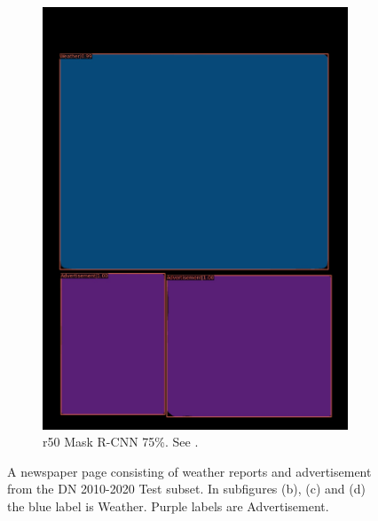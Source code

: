 \documentclass[oneside, english, bibtex]{kththesis}
\begin{document}
\begin{figure}[!htb]
\begin{adjustbox}{center,max size={\textwidth}{0.9\textheight}}
{\begin{subfigure}{0.6\textwidth}
\includegraphics[width=\linewidth]{figures/labels-vanilla-0.75/Jd55Bvg.jpg}
  \caption{r50 Mask R-CNN 75\%. See . }
  \label{fig:1RoKim0_pred}
\end{subfigure}}
\end{adjustbox}
  \caption{A newspaper page consisting of weather reports and advertisement from the DN 2010-2020 Test subset. In subfigures (b), (c) and (d) the blue label is Weather. Purple labels are Advertisement.}
\label{fig:Jd55Bvg}
\end{figure}
\clearpage

\end{document}
